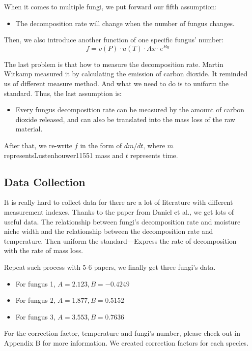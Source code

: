 \documentclass{mcmthesis}
\begin{document}
When it comes to multiple fungi, we put forward our fifth assumption:
\begin{itemize}
  \item The decomposition rate will change when the number of fungus changes.
\end{itemize}
Then, we also introduce another function of one specific fungus' number:
\begin{equation}
  f=v(P)\cdot u(T)\cdot Ax\cdot e^{By}
\end{equation}

The last problem is that how to measure the decomposition rate.
Martin Witkamp\cite{10.2307/1933765} measured it by calculating the emission of carbon dioxide.
It reminded us of different measure method.
And what we need to do is to uniform the standard.
Thus, the last assumption is:
\begin{itemize}
  \item Every fungus decomposition rate can be measured by the amount of carbon dioxide released, and can also be translated into the mass loss of the raw material.
\end{itemize}
After that, we re-write $f$ in the form of $dm/dt$, where $m$ representsLustenhouwer11551 mass and $t$ represents time.

\subsection{Data Collection}
It is really hard to collect data for there are a lot of literature with different measurement indexes.
Thanks to the paper from Daniel et al.\cite{maynard2019consistent}, we get lots of useful data.
The relationship between fungi's decomposition rate and moisture niche width and the relationship between the decomposition rate and temperature.
Then uniform the standard---Express the rate of decomposition with the rate of mass loss.

Repeat such process with 5-6 papers, we finally get three fungi's data.

\begin{itemize}
  \item For fungus 1, $A=2.123,B=-0.4249$
  \item For fungus 2, $A=1.877,B=0.5152$
  \item For fungus 3, $A=3.553,B=0.7636$
\end{itemize}

For the correction factor, temperature and fungi's number, please check out in Appendix B for more information.
We created correction factors for each species.
\end{document}
